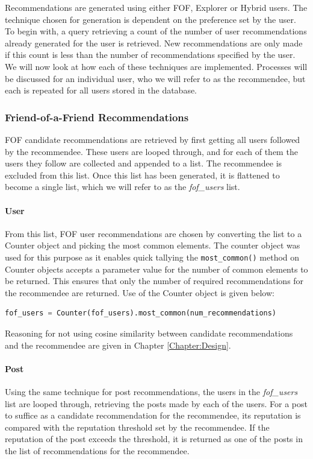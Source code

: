 Recommendations are generated using either FOF, Explorer or Hybrid users. The technique chosen for generation is dependent on the preference set by the user. To begin with, a query retrieving a count of the number of user recommendations already generated for the user is retrieved. New recommendations are only made if this count is less than the number of recommendations specified by the user. We will now look at how each of these techniques are implemented. Processes will be discussed for an individual user, who we will refer to as the recommendee, but each is repeated for all users stored in the database.

\subsubsection{Friend-of-a-Friend Recommendations}
FOF candidate recommendations are retrieved by first getting all users followed by the recommendee. These users are looped through, and for each of them the users they follow are collected and appended to a list. The recommendee is excluded from this list. Once this list has been generated, it is flattened to become a single list, which we will refer to as the \textit{fof\_users} list.

\paragraph{User} From this list, FOF user recommendations are chosen by converting the list to a Counter object and picking the most common elements. The counter object was used for this purpose as it enables quick tallying \cite{Python:Counter} the \texttt{most\_common()} method on Counter objects accepts a parameter value for the number of common elements to be returned. This ensures that only the number of required recommendations for the recommendee are returned. Use of the Counter object is given below:

\begin{lstlisting}[language=python]
	fof_users = Counter(fof_users).most_common(num_recommendations)
\end{lstlisting}

Reasoning for not using cosine similarity between candidate recommendations and the recommendee are given in Chapter \ref{Chapter:Design}.

\paragraph{Post} Using the same technique for post recommendations, the users in the \textit{fof\_users} list are looped through, retrieving the posts made by each of the  users. For a post to suffice as a candidate recommendation for the recommendee, its reputation is compared with the reputation threshold set by the recommendee. If the reputation of the post exceeds the threshold, it is returned as one of the posts in the list of recommendations for the recommendee.

